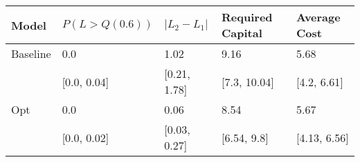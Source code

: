 \begin{tabular}{lllll}
\toprule
    Model & $P(L > Q(0.6))$ & $|L_2 - L_1|$ & Required Capital &  Average Cost \\
\midrule
 Baseline &             0.0 &          1.02 &             9.16 &          5.68 \\
          &     [0.0, 0.04] &  [0.21, 1.78] &     [7.3, 10.04] &   [4.2, 6.61] \\
      Opt &             0.0 &          0.06 &             8.54 &          5.67 \\
          &     [0.0, 0.02] &  [0.03, 0.27] &      [6.54, 9.8] &  [4.13, 6.56] \\
\bottomrule
\end{tabular}
